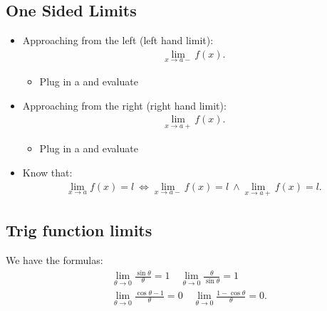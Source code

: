 \documentclass{report}
\begin{document}
    \subsection{One Sided Limits}
    \begin{itemize}
      \item Approaching from the left (left hand limit):
        \begin{align*}
          \lim\limits_{x \to a-}{f(x)}
        .\end{align*}
        \begin{itemize}
          \item Plug in a and evaluate
        \end{itemize}
      \item Approaching from the right (right hand limit):
        \begin{align*}
          \lim\limits_{x \to a+}{f(x)}
        .\end{align*}
        \begin{itemize}
          \item Plug in a and evaluate
        \end{itemize}
      \item Know that:
        \begin{align*}
          \lim\limits_{x \to a}{f(x) = l}\ \Leftrightarrow \lim\limits_{x \to a-}{f(x) = l}\ \wedge \lim\limits_{x \to a+}{f(x) = l}
        .\end{align*}
    \end{itemize}

    \bigbreak \noindent \bigbreak \noindent 
    \subsection{Trig function limits}
    \bigbreak \noindent 
    We have the formulas:
    \begin{align*}
      &\lim\limits_{\theta  \to 0}{\frac{\sin{\theta }}{\theta }} = 1 \quad \lim\limits_{\theta  \to 0}{\frac{\theta }{\sin{\theta}}} = 1 \\
      &\lim\limits_{\theta \to 0}{\frac{\cos{\theta } - 1}{\theta }} = 0 \quad \lim\limits_{\theta  \to 0}{\frac{1-\cos{\theta }}{\theta }} = 0
    .\end{align*}




    \bigbreak \noindent \bigbreak \noindent 
\end{document}
